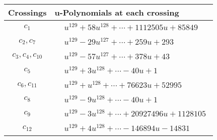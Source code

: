 \documentclass[1p]{elsarticle_modified}
\theoremstyle{definition}
\begin{document}
\begin{tabular}{m{50pt}|m{274pt}}
Crossings & \hspace{64pt}u-Polynomials at each crossing \\
\hline $$\begin{aligned}c_{1}\end{aligned}$$&$\begin{aligned}
&u^{129}+58 u^{128}+\cdots+1112505 u+85849
\end{aligned}$\\
\hline $$\begin{aligned}c_{2},c_{7}\end{aligned}$$&$\begin{aligned}
&u^{129}-29 u^{127}+\cdots+259 u+293
\end{aligned}$\\
\hline $$\begin{aligned}c_{3},c_{4},c_{10}\end{aligned}$$&$\begin{aligned}
&u^{129}-57 u^{127}+\cdots+378 u+43
\end{aligned}$\\
\hline $$\begin{aligned}c_{5}\end{aligned}$$&$\begin{aligned}
&u^{129}+3 u^{128}+\cdots-40 u+1
\end{aligned}$\\
\hline $$\begin{aligned}c_{6},c_{11}\end{aligned}$$&$\begin{aligned}
&u^{129}+u^{128}+\cdots+76623 u+52995
\end{aligned}$\\
\hline $$\begin{aligned}c_{8}\end{aligned}$$&$\begin{aligned}
&u^{129}-9 u^{128}+\cdots-40 u+1
\end{aligned}$\\
\hline $$\begin{aligned}c_{9}\end{aligned}$$&$\begin{aligned}
&u^{129}-3 u^{128}+\cdots+20927496 u+1128105
\end{aligned}$\\
\hline $$\begin{aligned}c_{12}\end{aligned}$$&$\begin{aligned}
&u^{129}+4 u^{128}+\cdots-146894 u-14831
\end{aligned}$\\
\hline
\end{tabular}\\~\\
\end{document}
